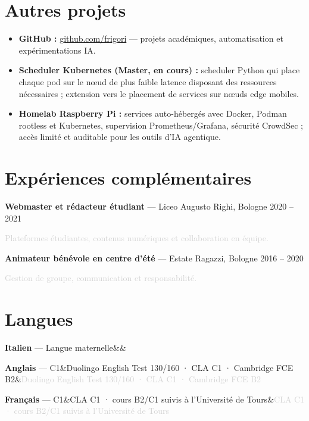 \documentclass[a4paper,10pt]{article}
\newcommand{\langentry}[3]{\noindent\textbf{#1} — #2\ifx&#3&\else\hfill\textcolor{lightgray}{\small #3}\fi\par\vspace{0.15em}}
\begin{document}
\section{Autres projets}
\begin{itemize}
  \item \textbf{GitHub :} \href{https://github.com/frigori}{github.com/frigori} — projets académiques, automatisation et expérimentations IA.
  \item \textbf{Scheduler Kubernetes (Master, en cours) :} scheduler Python qui place chaque pod sur le nœud de plus faible latence disposant des ressources nécessaires ; extension vers le placement de services sur nœuds edge mobiles.
  \item \textbf{Homelab Raspberry Pi :} services auto-hébergés avec Docker, Podman rootless et Kubernetes, supervision Prometheus/Grafana, sécurité CrowdSec ; accès limité et auditable pour les outils d'IA agentique.
\end{itemize}

\section{Expériences complémentaires}
\textbf{Webmaster et rédacteur étudiant} — Liceo Augusto Righi, Bologne \hfill \textcolor{accent}{2020 -- 2021}\par
\textcolor{lightgray}{\small Plateformes étudiantes, contenus numériques et collaboration en équipe.}\par
\textbf{Animateur bénévole en centre d'été} — Estate Ragazzi, Bologne \hfill \textcolor{accent}{2016 -- 2020}\par
\textcolor{lightgray}{\small Gestion de groupe, communication et responsabilité.}

\section{Langues}
\langentry{Italien}{Langue maternelle}{}
\langentry{Anglais}{C1}{Duolingo English Test 130/160 · CLA C1 · Cambridge FCE B2}
\langentry{Français}{C1}{CLA C1 · cours B2/C1 suivis à l'Université de Tours}
\end{document}
